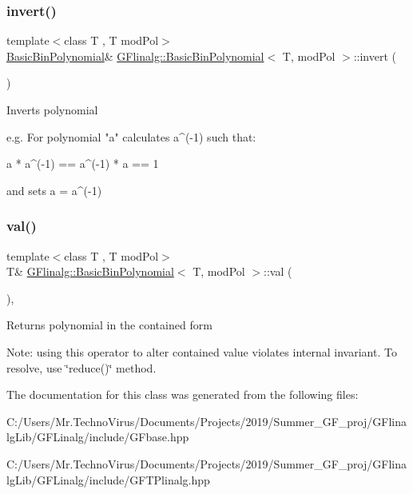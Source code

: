 \subsubsection{\texorpdfstring{invert()}{invert()}}
{\footnotesize\ttfamily template$<$class T , T mod\+Pol$>$ \\
\mbox{\hyperlink{class_g_flinalg_1_1_basic_bin_polynomial}{Basic\+Bin\+Polynomial}}\& \mbox{\hyperlink{class_g_flinalg_1_1_basic_bin_polynomial}{G\+Flinalg\+::\+Basic\+Bin\+Polynomial}}$<$ T, mod\+Pol $>$\+::invert (\begin{DoxyParamCaption}{ }\end{DoxyParamCaption})\hspace{0.3cm}{\ttfamily [inline]}}

Inverts polynomial \begin{DoxyVerb}e.g. For polynomial "a" calculates a^(-1) such that:

a * a^(-1) == a^(-1) * a == 1

and sets a = a^(-1)
\end{DoxyVerb}
 \mbox{\label{class_g_flinalg_1_1_basic_bin_polynomial_a86d07870227edb5553b981f3183d0f9e}} 
\subsubsection{\texorpdfstring{val()}{val()}}
{\footnotesize\ttfamily template$<$class T , T mod\+Pol$>$ \\
T\& \mbox{\hyperlink{class_g_flinalg_1_1_basic_bin_polynomial}{G\+Flinalg\+::\+Basic\+Bin\+Polynomial}}$<$ T, mod\+Pol $>$\+::val (\begin{DoxyParamCaption}{ }\end{DoxyParamCaption})\hspace{0.3cm}{\ttfamily [inline]}, {\ttfamily [noexcept]}}

Returns polynomial in the contained form

Note\+: using this operator to alter contained value violates internal invariant. To resolve, use \char`\"{}reduce()\char`\"{} method. 

The documentation for this class was generated from the following files\+:\begin{DoxyCompactItemize}
\item 
C\+:/\+Users/\+Mr.\+Techno\+Virus/\+Documents/\+Projects/2019/\+Summer\+\_\+\+G\+F\+\_\+proj/\+G\+Flinalg\+Lib/\+G\+F\+Linalg/include/G\+Fbase.\+hpp\item 
C\+:/\+Users/\+Mr.\+Techno\+Virus/\+Documents/\+Projects/2019/\+Summer\+\_\+\+G\+F\+\_\+proj/\+G\+Flinalg\+Lib/\+G\+F\+Linalg/include/G\+F\+T\+Plinalg.\+hpp\end{DoxyCompactItemize}
